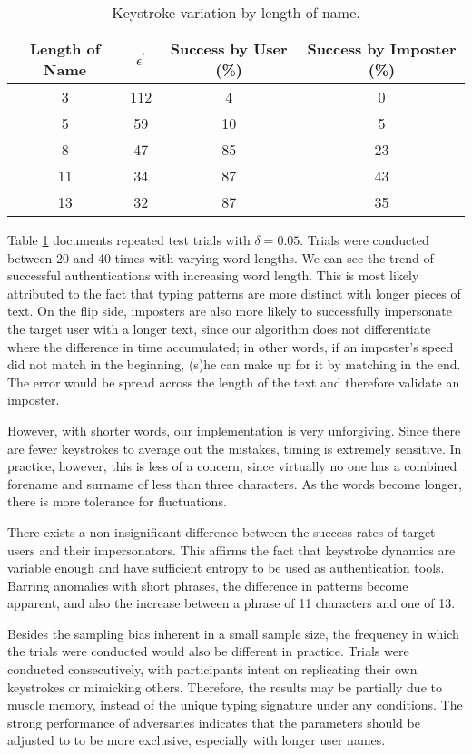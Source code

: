 \documentclass[11pt]{article}
\begin{document}
\begin{table}[h!]
\centering
\begin{tabular}{||c c c c||} 
 \hline
 Length of Name & $\epsilon^{'}$ & Success by User (\%) & Success by Imposter (\%) \\ [0.5ex] 
 \hline\hline
 3 & 112 & 4 & 0 \\ 
 5 & 59 & 10 & 5 \\
 8 & 47 & 85 & 23 \\ 
 11 & 34 & 87 & 43 \\
 13 & 32 & 87 & 35 \\ [1ex] 
 \hline
\end{tabular}
\caption{Keystroke variation by length of name.}
\label{table:1}
\end{table}

Table \ref{table:1} documents repeated test trials with $\delta=0.05$.  Trials were conducted between 20 and 40 times with varying word lengths.  We can see the trend of successful authentications with increasing word length.  This is most likely attributed to the fact that typing patterns are more distinct with longer pieces of text.  On the flip side, imposters are also more likely to successfully impersonate the target user with a longer text, since our algorithm does not differentiate where the difference in time accumulated; in other words, if an imposter's speed did not match in the beginning, (s)he can make up for it by matching in the end.  The error would be spread across the length of the text and therefore validate an imposter.

However, with shorter words, our implementation is very unforgiving.  Since there are fewer keystrokes to average out the mistakes, timing is extremely sensitive.  In practice, however, this is less of a concern, since virtually no one has a combined forename and surname of less than three characters.   As the words become longer, there is more tolerance for fluctuations.

There exists a non-insignificant difference between the success rates of target users and their impersonators.  This affirms the fact that keystroke dynamics are variable enough and have sufficient entropy to be used as authentication tools.  Barring anomalies with short phrases, the difference in patterns become apparent, and also the increase between a phrase of 11 characters and one of 13. 

Besides the sampling bias inherent in a small sample size, the frequency in which the trials were conducted would also be different in practice. Trials were conducted consecutively, with participants intent on replicating their own keystrokes or mimicking others.  Therefore, the results may be partially due to muscle memory, instead of the unique typing signature under any conditions.  The strong performance of adversaries indicates that the parameters should be adjusted to to be more exclusive, especially with longer user names.
\end{document}
